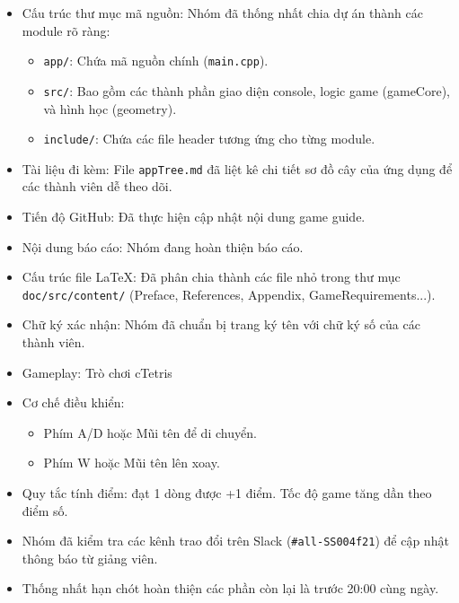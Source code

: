 \documentclass[12pt,a4paper]{article}
\begin{document}
\begin{itemize}
    \item Cấu trúc thư mục mã nguồn: Nhóm đã thống nhất chia dự án thành các module rõ ràng:
    \begin{itemize}
        \item \texttt{app/}: Chứa mã nguồn chính (\texttt{main.cpp}).
        \item \texttt{src/}: Bao gồm các thành phần giao diện console, logic game (gameCore), và hình học (geometry).
        \item \texttt{include/}: Chứa các file header tương ứng cho từng module.
    \end{itemize}
    \item Tài liệu đi kèm: File \texttt{appTree.md} đã liệt kê chi tiết sơ đồ cây của ứng dụng để các thành viên dễ theo dõi.
    \item Tiến độ GitHub: Đã thực hiện cập nhật nội dung game guide.
\end{itemize}

\begin{itemize}
    \item Nội dung báo cáo: Nhóm đang hoàn thiện báo cáo.
    \item Cấu trúc file LaTeX: Đã phân chia thành các file nhỏ trong thư mục \texttt{doc/src/content/} (Preface, References, Appendix, GameRequirements...).
    \item Chữ ký xác nhận: Nhóm đã chuẩn bị trang ký tên với chữ ký số của các thành viên.
\end{itemize}

\begin{itemize}
    \item Gameplay: Trò chơi cTetris
    \item Cơ chế điều khiển:
    \begin{itemize}
        \item Phím A/D hoặc Mũi tên để di chuyển.
        \item Phím W hoặc Mũi tên lên xoay.
    \end{itemize}
    \item Quy tắc tính điểm: đạt 1 dòng được +1 điểm. Tốc độ game tăng dần theo điểm số.
\end{itemize}

\begin{itemize}
    \item Nhóm đã kiểm tra các kênh trao đổi trên Slack (\texttt{\#all-SS004f21}) để cập nhật thông báo từ giảng viên.
    \item Thống nhất hạn chót hoàn thiện các phần còn lại là trước 20:00 cùng ngày.
\end{itemize}
\end{document}
